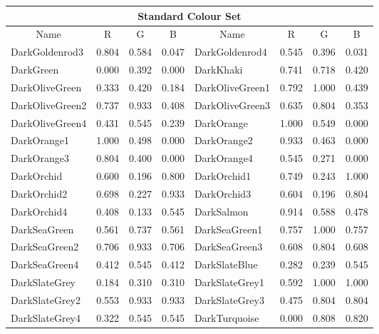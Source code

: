 {\begin{center}
\begin{tabular}{|l|l|l|l|l|l|l|l|}
\hline
\multicolumn{8}{|c|}{{\large Standard Colour Set}} \\ \hline
\multicolumn{1}{|c|}{Name} & \multicolumn{1}{|c|}{R} & \multicolumn{1}{c|}{G} &
\multicolumn{1}{c|}{B} & \multicolumn{1}{|c|}{Name} & \multicolumn{1}{c|}{R} &
\multicolumn{1}{c|}{G} & \multicolumn{1}{c|}{B}  \\ \hline
DarkGoldenrod3      & 0.804 & 0.584 & 0.047 & DarkGoldenrod4      & 0.545 & 0.396 & 0.031 \\ 
DarkGreen           & 0.000 & 0.392 & 0.000 & DarkKhaki           & 0.741 & 0.718 & 0.420 \\ 
DarkOliveGreen      & 0.333 & 0.420 & 0.184 & DarkOliveGreen1     & 0.792 & 1.000 & 0.439 \\ 
DarkOliveGreen2     & 0.737 & 0.933 & 0.408 & DarkOliveGreen3     & 0.635 & 0.804 & 0.353 \\ 
DarkOliveGreen4     & 0.431 & 0.545 & 0.239 & DarkOrange          & 1.000 & 0.549 & 0.000 \\ 
DarkOrange1         & 1.000 & 0.498 & 0.000 & DarkOrange2         & 0.933 & 0.463 & 0.000 \\ 
DarkOrange3         & 0.804 & 0.400 & 0.000 & DarkOrange4         & 0.545 & 0.271 & 0.000 \\ 
DarkOrchid          & 0.600 & 0.196 & 0.800 & DarkOrchid1         & 0.749 & 0.243 & 1.000 \\ 
DarkOrchid2         & 0.698 & 0.227 & 0.933 & DarkOrchid3         & 0.604 & 0.196 & 0.804 \\ 
DarkOrchid4         & 0.408 & 0.133 & 0.545 & DarkSalmon          & 0.914 & 0.588 & 0.478 \\ 
DarkSeaGreen        & 0.561 & 0.737 & 0.561 & DarkSeaGreen1       & 0.757 & 1.000 & 0.757 \\ 
DarkSeaGreen2       & 0.706 & 0.933 & 0.706 & DarkSeaGreen3       & 0.608 & 0.804 & 0.608 \\ 
DarkSeaGreen4       & 0.412 & 0.545 & 0.412 & DarkSlateBlue       & 0.282 & 0.239 & 0.545 \\ 
DarkSlateGrey       & 0.184 & 0.310 & 0.310 & DarkSlateGrey1      & 0.592 & 1.000 & 1.000 \\ 
DarkSlateGrey2      & 0.553 & 0.933 & 0.933 & DarkSlateGrey3      & 0.475 & 0.804 & 0.804 \\ 
DarkSlateGrey4      & 0.322 & 0.545 & 0.545 & DarkTurquoise       & 0.000 & 0.808 & 0.820 \\ 

\end{tabular}
\end{center}}
